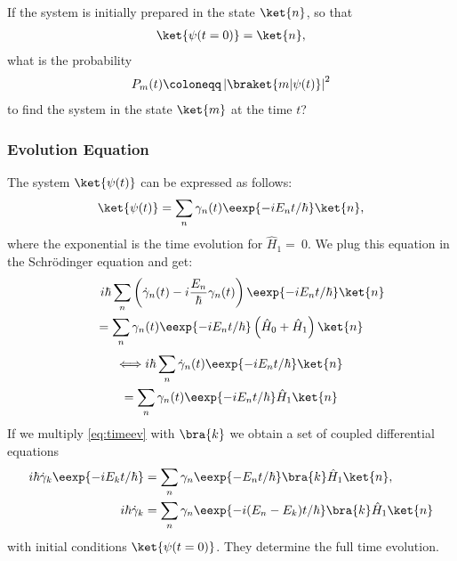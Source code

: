			If the system is initially prepared in the state $\ket{n}$, so that
			\begin{align}
				\ket{\psi(t=0)} = \ket{n},
			\end{align}
			what is the probability
			\begin{align}
				P_m(t) \coloneqq \left|\braket{m|\psi(t)}\right|^2
			\end{align}
			to find the system in the state $\ket{m}$ at the time $t$?

			\subsubsection{Evolution Equation}
				The system $\ket{\psi(t)}$ can be expressed as follows:
				\begin{align}
					\ket{\psi(t)} = \sum_n \gamma_n(t) \eexp{-i{E_n}t/{\hbar}} \ket{n},
				\end{align}
				where the exponential is the time evolution for $\hat{H}_1 =~0$.
				We plug this equation in the Schrödinger equation and get:
				\begin{multline}
					\hphantom{\Longleftrightarrow} i\hbar \sum_n\left(\dot{\gamma}_n(t)-i\frac{E_n}{\hbar}\gamma_n(t)\right)\eexp{-i{E_n}t/{\hbar}}\ket{n} \\
					= \sum_n \gamma_n(t) \eexp{-i{E_n}t/{\hbar}}\left(\hat{H}_0 + \hat{H}_1\right) \ket{n}
				\end{multline}
				\begin{multline}\label{eq:timeev}
					\Longleftrightarrow i\hbar\sum_n \dot{\gamma}_n(t) \eexp{-i{E_n}t/{\hbar}} \ket{n}\\
					= \sum_n \gamma_n(t) \eexp{-i{E_n}t/{\hbar}} \hat{H}_1 \ket{n}
				\end{multline}
				If we multiply \eqref{eq:timeev} with $\bra{k}$ we obtain a set of coupled differential equations
				\begin{align}
					i\hbar \dot{\gamma}_k \eexp{-i{E_k}t/{\hbar}} &= \sum_n \gamma_n \eexp{-{E_n}t/{\hbar}}\bra{k}\hat{H}_1\ket{n},\\
					i\hbar \dot{\gamma}_k &= \sum_n \gamma_n \eexp{-i {(E_n-E_k)}t/{\hbar}} \bra{k} \hat{H}_1\ket{n}
				\end{align}
				with initial conditions $\ket{\psi(t=0)}$. They determine the full time evolution.

